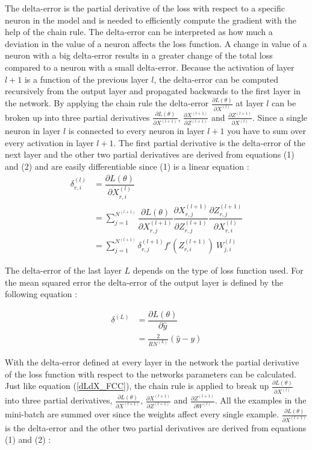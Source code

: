 \documentclass[a4paper, twoside]{article}
\newcommand*{\pd}[2]{\ensuremath{\dfrac{\partial #1}{\partial #2}}}
\newcommand*{\inpd}[2]{\ensuremath{\frac{\partial #1}{\partial #2}}}
\begin{document}
The delta-error is the partial derivative of the loss with respect to a specific neuron in the model and is needed to efficiently compute the gradient with the help of the chain rule. The delta-error can be interpreted as how much a deviation in the value of a neuron affects the loss function. A change in value of a neuron with a big delta-error results in a greater change of the total loss compared to a neuron with a small delta-error. Because the activation of layer $l+1$ is a function of the previous layer $l$, the delta-error can be computed recursively from the output layer and propagated backwards to the first layer in the network. By applying the chain rule the delta-error $\inpd{L(\theta)}{X^{(l)}}$  at layer $l$ can be broken up into three partial derivatives $\inpd{L(\theta)}{X^{(l+1)}}$, $\inpd{X^{(l+1)}}{Z^{(l+1)}}$ and $\inpd{Z^{(l+1)}}{X^{(l)}}$. Since a single neuron in layer $l$ is connected to every neuron in layer $l+1$ you have to sum over every activation in layer $l+1$. The first partial derivative is the delta-error of the next layer and the other two partial derivatives are derived from equations (1) and (2) and are easily differentiable since (1) is a linear equation \cite{cs231n} \cite{wikiStanford}:
\begin{equation}\label{dLdX_FCC}
\begin{split}
\delta^{(l)}_{r,i}
	& = \pd{L(\theta)}{X^{(l)}_{r,i}}  \\
	& = \sum^{N^{(l+1)}}_{j=1} \pd{L(\theta)}{X^{(l+1)}_{r,j}} \pd{X^{(l+1)}_{r,j}}{Z^{(l+1)}_{r,j}} \pd{Z^{(l+1)}_{r,j}}{X^{(l)}_{r,i}} \\
	& = \sum^{N^{(l+1)}}_{j=1} \delta^{(l+1)}_{r,j} f'(Z^{(l+1)}_{r,i}) \ W^{(l)}_{j,i} 
\end{split}
\end{equation}

The delta-error of the last layer $L$ depends on the type of loss function used. For the mean squared error the delta-error of the output layer is defined by the following equation \cite{cs231n} \cite{wikiStanford}:

\begin{equation}\label{MSEdelta}
\begin{split}
\delta^{(L)}
	& = \pd{L(\theta)}{\hat{y}}  \\
	& = \frac{2}{RN^{(L)}} (\hat{y}-y)
\end{split}
\end{equation}

With the delta-error defined at every layer in the network the partial derivative of the loss function with respect to the networks parameters can be calculated. Just like equation (\ref{dLdX_FCC}), the chain rule is applied to break up $\inpd{L(\theta)}{X^{(l)}}$ into three partial derivatives, $\inpd{L(\theta)}{X^{(l+1)}}$, $\inpd{X^{(l+1)}}{Z^{(l+1)}}$ and $\inpd{Z^{(l+1)}}{W^{(l)}}$. All the examples in the mini-batch are summed over since the weights affect every single example. $\inpd{L(\theta)}{X^{(l+1)}}$ is the delta-error and the other two partial derivatives are derived from equations (1) and (2) \cite{cs231n} \cite{wikiStanford}:
\end{document}
